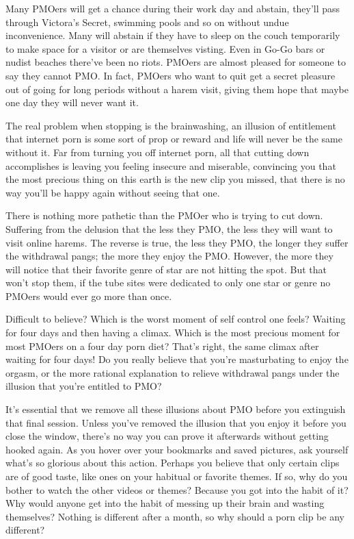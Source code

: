 \documentclass[easypeasy.tex]{subfiles}
\begin{document}
Many PMOers will get a chance during their work day and abstain, they'll pass through Victora's Secret, swimming pools and so on without undue inconvenience. Many will abstain if they have to sleep on the couch temporarily to make space for a visitor or are themselves visting. Even in Go-Go bars or nudist beaches there've been no riots. PMOers are almost pleased for someone to say they cannot PMO. In fact, PMOers who want to quit get a secret pleasure out of going for long periods without a harem visit, giving them hope that maybe one day they will never want it.

The real problem when stopping is the brainwashing, an illusion of entitlement that internet porn is some sort of prop or reward and life will never be the same without it. Far from turning you off internet porn, all that cutting down accomplishes is leaving you feeling insecure and miserable, convincing you that the most precious thing on this earth is the new clip you missed, that there is no way you'll be happy again without seeing that one.

There is nothing more pathetic than the PMOer who is trying to cut down. Suffering from the delusion that the less they PMO, the less they will want to visit online harems. The reverse is true, the less they PMO, the longer they suffer the withdrawal pangs; the more they enjoy the PMO. However, the more they will notice that their favorite genre of star are not hitting the spot. But that won't stop them, if the tube sites were dedicated to only one star or genre no PMOers would ever go more than once.

Difficult to believe? Which is the worst moment of self control one feels? Waiting for four days and then having a climax. Which is the most precious moment for most PMOers on a four day porn diet? That's right, the same climax after waiting for four days! Do you really believe that you're masturbating to enjoy the orgasm, or the more rational explanation to relieve withdrawal pangs under the illusion that you're entitled to PMO?

It's essential that we remove all these illusions about PMO before you extinguish that final session. Unless you've removed the illusion that you enjoy it before you close the window, there's no way you can prove it afterwards without getting hooked again. As you hover over your bookmarks and saved pictures, ask yourself what's so glorious about this action. Perhaps you believe that only certain clips are of good taste, like ones on your habitual or favorite themes. If so, why do you bother to watch the other videos or themes? Because you got into the habit of it? Why would anyone get into the habit of messing up their brain and wasting themselves? Nothing is different after a month, so why should a porn clip be any different?
\end{document}
